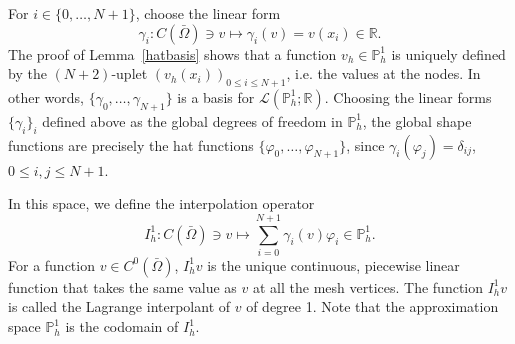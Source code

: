\documentclass{article}
\begin{document}
For $i \in \{0, \dots, N+1\}$, choose the linear form
$$ \gamma_i: C(\bar{\Omega}) \ni v \mapsto \gamma_i(v) = v(x_i) \in \mathbb{R}. $$
The proof of Lemma~\ref{hatbasis} shows that a function $v_h \in \mathbb{P}_h^1$ is uniquely defined by the $(N+2)$-uplet $(v_h(x_i))_{0 \le i \le N+1}$, i.e. the values at the nodes. In other words, $\{\gamma_0, \dots, \gamma_{N+1}\}$ is a basis for $\mathcal{L}(\mathbb{P}_h^1; \mathbb{R})$. Choosing the linear forms $\{\gamma_i\}_i$ defined above as the global degrees of freedom in $\mathbb{P}_h^1$, the global shape functions are precisely the hat functions $\{\varphi_0, \dots, \varphi_{N+1}\}$, since $\gamma_i(\varphi_j) = \delta_{ij}$, $0 \le i,j \le N+1$.

In this space, we define the interpolation operator
$$ I_h^1: C(\bar{\Omega}) \ni v \mapsto \sum_{i=0}^{N+1} \gamma_i(v) \varphi_i \in \mathbb{P}_h^1.$$
For a function $v \in C^0(\bar{\Omega})$, $I_h^1 v$ is the unique continuous, piecewise linear function that takes the same value as $v$ at all the mesh vertices. The function $I_h^1 v$ is called the Lagrange interpolant of $v$ of degree 1. Note that the approximation space $\mathbb{P}_h^1$ is the codomain of $I_h^1$. 
\end{document}
